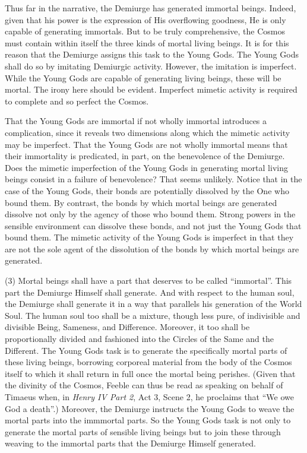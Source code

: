Thus far in the narrative, the Demiurge has generated immortal beings. Indeed, given that his power is the expression of His overflowing goodness, He is only capable of generating immortals. But to be truly comprehensive, the Cosmos must contain within itself the three kinds of mortal living beings. It is for this reason that the Demiurge assigns this task to the Young Gods. The Young Gods shall do so by imitating Demiurgic activity. However, the imitation is imperfect. While the Young Gods are capable of generating living beings, these will be mortal. The irony here should be evident. Imperfect mimetic activity is required to complete and so perfect the Cosmos.

That the Young Gods are immortal if not wholly immortal introduces a complication, since it reveals two dimensions along which the mimetic activity may be imperfect. That the Young Gods are not wholly immortal means that their immortality is predicated, in part, on the benevolence of the Demiurge. Does the mimetic imperfection of the Young Gods in generating mortal living beings consist in a failure of benevolence? That seems unlikely. Notice that in the case of the Young Gods, their bonds are potentially dissolved by the One who bound them. By contrast, the bonds by which mortal beings are generated dissolve not only by the agency of those who bound them. Strong powers in the sensible environment can dissolve these bonds, and not just the Young Gods that bound them. The mimetic activity of the Young Gods is imperfect in that they are not the sole agent of the dissolution of the bonds by which mortal beings are generated.

(3) Mortal beings shall have a part that deserves to be called ``immortal''. This part the Demiurge Himself shall generate. And with respect to the human soul, the Demiurge shall generate it in a way that parallels his generation of the World Soul. The human soul too shall be a mixture, though less pure, of indivisible and divisible Being, Sameness, and Difference. Moreover, it too shall be proportionally divided and fashioned into the Circles of the Same and the Different. The Young Gods task is to generate the specifically mortal parts of these living beings, borrowing corporeal material from the body of the Cosmos itself to which it shall return in full once the mortal being perishes. (Given that the divinity of the Cosmos, Feeble can thus be read as speaking on behalf of Timaeus when, in \emph{Henry IV Part 2}, Act 3, Scene 2, he proclaims that ``We owe God a death''.) Moreover, the Demiurge instructs the Young Gods to weave the mortal parts into the immmortal parts. So the Young Gods task is not only to generate the mortal parts of sensible living beings but to join these through weaving to the immortal parts that the Demiurge Himself generated.

